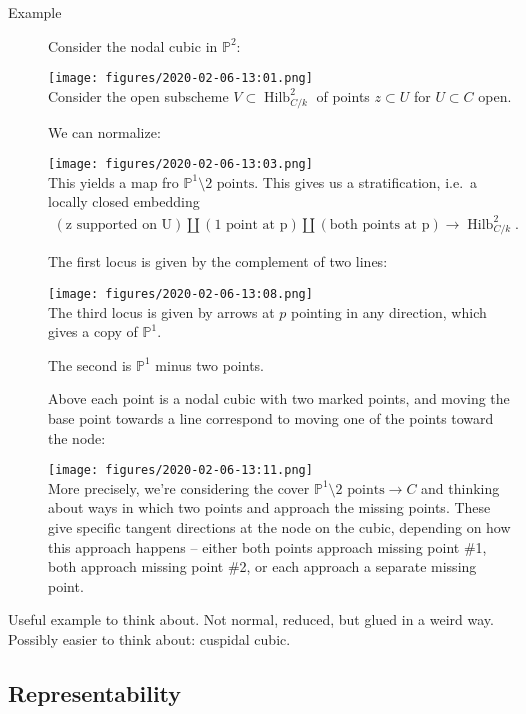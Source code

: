 \begin{description}
\item[Example]
Consider the nodal cubic in \({\mathbb{P}}^2\):

\texttt{[image: figures/2020-02-06-13:01.png]}\\

Consider the open subscheme \(V \subset \operatorname{Hilb}_{C/k}^2\) of
points \(z \subset U\) for \(U \subset C\) open.

We can normalize:

\texttt{[image: figures/2020-02-06-13:03.png]}\\

This yields a map fro \({\mathbb{P}}^1 \setminus\text{2 points}\). This
gives us a stratification, i.e.~a locally closed embedding
\begin{align*}
(\text{z supported on U}) {\coprod}(\text{1 point at p}) {\coprod}(\text{both points at p}) \to \operatorname{Hilb}_{C/k}^2
.\end{align*}

The first locus is given by the complement of two lines:

\texttt{[image: figures/2020-02-06-13:08.png]}\\

The third locus is given by arrows at \(p\) pointing in any direction,
which gives a copy of \({\mathbb{P}}^1\).

The second is \({\mathbb{P}}^1\) minus two points.

Above each point is a nodal cubic with two marked points, and moving the
base point towards a line correspond to moving one of the points toward
the node:

\texttt{[image: figures/2020-02-06-13:11.png]}\\

More precisely, we're considering the cover
\({\mathbb{P}}^1 \setminus\text{2 points} \to C\) and thinking about
ways in which two points and approach the missing points. These give
specific tangent directions at the node on the cubic, depending on how
this approach happens -- either both points approach missing point \#1,
both approach missing point \#2, or each approach a separate missing
point.
\end{description}

Useful example to think about. Not normal, reduced, but glued in a weird
way. Possibly easier to think about: cuspidal cubic.

\hypertarget{representability-1}{%
\subsection{Representability}\label{representability-1}}

